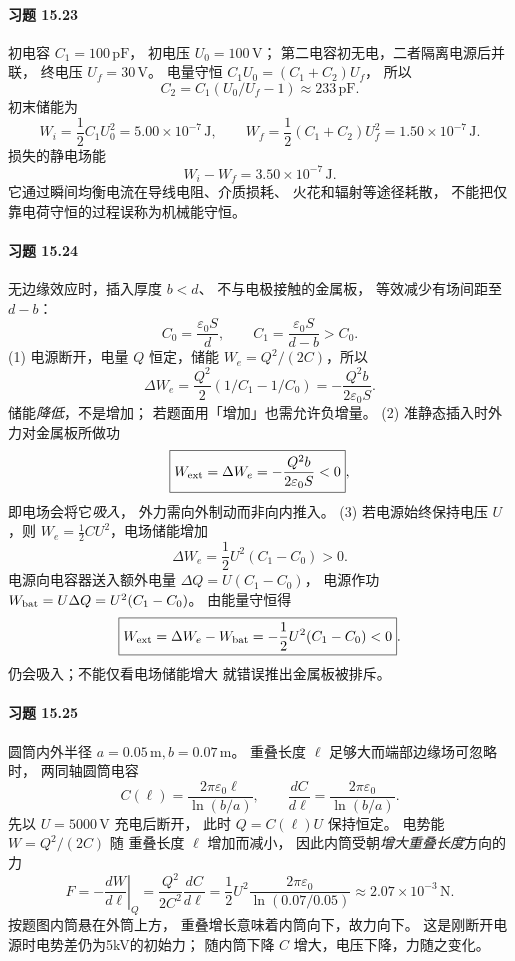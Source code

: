 \paragraph{习题 15.23}
初电容 \(C_1=100\,\mathrm{pF}\)，
初电压 \(U_0=100\,\mathrm V\)；
第二电容初无电，二者隔离电源后并联，
终电压 \(U_f=30\,\mathrm V\)。
电量守恒
\(C_1U_0=(C_1+C_2)U_f\)，
所以
\[
 \boxed{C_2=C_1(U_0/U_f-1)
 \approx233\,\mathrm{pF}}.
\]
初末储能为
\[
 W_i=\frac12C_1U_0^2=5.00\times10^{-7}\,\mathrm J,
\qquad
 W_f=\frac12(C_1+C_2)U_f^2
 =1.50\times10^{-7}\,\mathrm J.
\]
损失的静电场能
\[
 \boxed{W_i-W_f=3.50\times10^{-7}\,\mathrm J}.
\]
它通过瞬间均衡电流在导线电阻、介质损耗、
火花和辐射等途径耗散，
不能把仅靠电荷守恒的过程误称为机械能守恒。

\paragraph{习题 15.24}
无边缘效应时，插入厚度 \(b<d\)、
不与电极接触的金属板，
等效减少有场间距至 \(d-b\)：
\[
 C_0=\frac{\varepsilon_0S}{d},\qquad
 C_1=\frac{\varepsilon_0S}{d-b}>C_0.
\]
(1) 电源断开，电量 \(Q\) 恒定，储能
\(W_e=Q^2/(2C)\)，所以
\[
 \boxed{\Delta W_e=
 \frac{Q^2}{2}(1/C_1-1/C_0)
 =-\frac{Q^2b}{2\varepsilon_0S}}.
\]
储能\emph{降低}，不是增加；
若题面用「增加」也需允许负增量。
(2) 准静态插入时外力对金属板所做功
\[
 \boxed{W_{\rm ext}=\Delta W_e
 =-\frac{Q^2b}{2\varepsilon_0S}<0},
\]
即电场会将它\emph{吸入}，
外力需向外制动而非向内推入。
(3) 若电源始终保持电压 \(U\)，则
\(W_e=\tfrac12CU^2\)，电场储能增加
\[
 \boxed{\Delta W_e=
 \frac12U^2(C_1-C_0)>0}.
\]
电源向电容器送入额外电量
\(\Delta Q=U(C_1-C_0)\)，
电源作功 \(W_{\rm bat}=U\Delta Q
 =U^2(C_1-C_0)\)。
由能量守恒得
\[
 \boxed{W_{\rm ext}=\Delta W_e-W_{\rm bat}
 =-\frac12U^2(C_1-C_0)<0}.
\]
仍会吸入；不能仅看电场储能增大
就错误推出金属板被排斥。

\paragraph{习题 15.25}
圆筒内外半径
\(a=0.05\,\mathrm m,b=0.07\,\mathrm m\)。
重叠长度 \(\ell\) 足够大而端部边缘场可忽略时，
两同轴圆筒电容
\[
 C(\ell)=\frac{2\pi\varepsilon_0\ell}
 {\ln(b/a)},\qquad
 \frac{dC}{d\ell}
 =\frac{2\pi\varepsilon_0}{\ln(b/a)}.
\]
先以 \(U=5000\,\mathrm V\) 充电后断开，
此时 \(Q=C(\ell)U\) 保持恒定。
电势能 \(W=Q^2/(2C)\) 随
重叠长度 \(\ell\) 增加而减小，
因此内筒受朝\emph{增大重叠长度}方向的力
\[
 \boxed{F=-\left.\frac{dW}{d\ell}\right|_Q
 =\frac{Q^2}{2C^2}\frac{dC}{d\ell}
 =\frac12U^2\frac{2\pi\varepsilon_0}{\ln(0.07/0.05)}
 \approx2.07\times10^{-3}\,\mathrm N}.
\]
按题图内筒悬在外筒上方，
重叠增长意味着内筒向下，故力向下。
这是刚断开电源时电势差仍为5kV的初始力；
随内筒下降 \(C\) 增大，电压下降，力随之变化。

